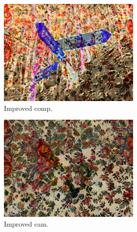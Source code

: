 \begin{figure}[]
\begin{subfigure}{\textwidth}
        \begin{subfigure}{0.24\textwidth}
            \centering
            \includegraphics[width=\textwidth]{images/04-experiment02/photo/flowers/improved_im.jpg}
            \caption*{Improved comp.}
        \end{subfigure}
        \hfill
        \begin{subfigure}{0.24\textwidth}
            \centering
            \includegraphics[width=\textwidth]{images/04-experiment02/photo/flowers/improved_proj.jpg}
            \caption*{Improved cam.}
        \end{subfigure}
        \hfill
        \begin{subfigure}{0.24\textwidth}
            \centering

\end{subfigure}
\end{subfigure}
\end{figure}
